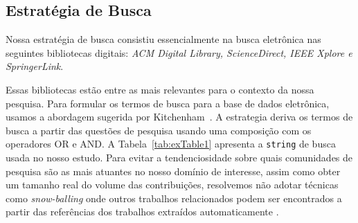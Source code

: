 \subsection{Estratégia de Busca}\label{estrategia_busca}
	Nossa estratégia de busca consistiu essencialmente na busca eletrônica nas seguintes bibliotecas digitais: 
\emph{ACM Digital Library, ScienceDirect, IEEE Xplore e SpringerLink}.


\noindent Essas bibliotecas estão entre as mais relevantes para o contexto da nossa pesquisa. Para formular os termos de busca para a base de dados eletrônica, usamos a abordagem sugerida por Kitchenham~\cite{kitchenham:techReport2007,budgen:ppig2008}. A estrategia 
deriva os termos de busca a partir das questões de pesquisa usando uma composição com os operadores OR e AND. A  Tabela~\ref{tab:exTable1} apresenta a \texttt{string} de busca usada no nosso estudo. Para evitar a tendenciosidade sobre quais comunidades de pesquisa s\~{a}o as mais atuantes no nosso dom\'{i}nio de interesse, assim como obter um tamanho real do volume das contribuições, resolvemos não adotar técnicas como \emph{snow-balling} onde outros trabalhos relacionados podem ser encontrados a partir das referências dos trabalhos extraídos automaticamente \cite{budgen:ppig2008}.

